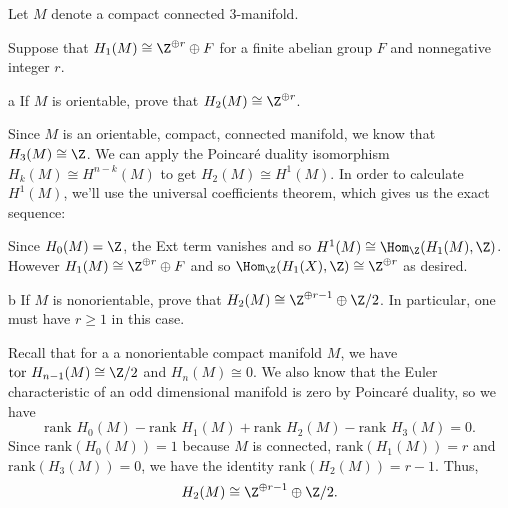 \documentclass[11pt,letterpaper]{article}
\providecommand{\Ext}{\text{Ext}}
\begin{document}
\begin{problem}
    Let $M$ denote a compact connected $3$-manifold.
\end{problem}

\begin{solution}
    Suppose that $H_1(M)\cong \Z^{\oplus r}\oplus F$ for a finite abelian group $F$ and nonnegative integer $r$. 
    \begin{partproblem}{a}
        If $M$ is orientable, prove that $H_2(M)\cong \Z^{\oplus r}$.
    \end{partproblem}

    \quad Since $M$ is an orientable, compact, connected manifold, we know that $H_3(M)\cong \Z$. We can apply the Poincar\'e duality isomorphism $H_k(M) \cong H^{n-k}(M)$ to get $H_2(M)\cong H^1(M)$. In order to calculate $H^1(M)$, we'll use the universal coefficients theorem, which gives us the exact sequence:
    \begin{center}
    \end{center}
    Since $H_0(M)=\Z$, the Ext term vanishes and so $H^1(M)\cong \Hom_\Z(H_1(M), \Z)$. However $H_1(M)\cong \Z^{\oplus r}\oplus F$ and so $\Hom_\Z(H_1(X), \Z)\cong \Z^{\oplus r}$ as desired.

    \begin{partproblem}{b}
        If $M$ is nonorientable, prove that $H_2(M)\cong \Z^{\oplus r-1}\oplus \Z /2$. In particular, one must have $r\geq 1$ in this case. %
    \end{partproblem}

    \quad Recall that for a a nonorientable compact manifold $M$, we have $\text{tor }H_{n-1}(M) \cong \Z /2$ and $H_n(M)\cong 0$. We also know that the Euler characteristic of an odd dimensional manifold is zero by Poincar\'e duality, so we have
    \[
        \text{rank }H_0(M) - \text{rank }H_1(M) + \text{rank }H_2(M) - \text{rank }H_3(M) = 0
    .\]   
    Since $\text{rank}(H_0(M))=1$ because $M$ is connected, $\text{rank}(H_1(M)) = r$ and $\text{rank}(H_3(M)) = 0$, we have the identity $\text{rank}(H_2(M)) = r-1$. Thus,
    \[
        H_2(M) \cong \Z^{\oplus r - 1}\oplus \Z / 2
    .\] 


\end{solution}
\end{document}
